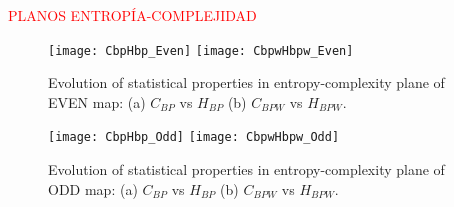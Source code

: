 \textcolor{red}{PLANOS ENTROPÍA-COMPLEJIDAD}

\begin{figure}
	\texttt{[image: CbpHbp\_Even]}
	\texttt{[image: CbpwHbpw\_Even]}
	\caption{Evolution of statistical properties in entropy-complexity plane of EVEN map: (a) $C_{BP}$ vs $H_{BP}$ (b) $C_{BPW}$ vs $H_{BPW}$.}
	\label{fig:EVEN_HC}
\end{figure}

\begin{figure}
	\texttt{[image: CbpHbp\_Odd]}
	\texttt{[image: CbpwHbpw\_Odd]}
	\caption{Evolution of statistical properties in entropy-complexity plane of ODD map: (a) $C_{BP}$ vs $H_{BP}$ (b) $C_{BPW}$ vs $H_{BPW}$.}
	\label{fig:ODD_HC}
\end{figure}